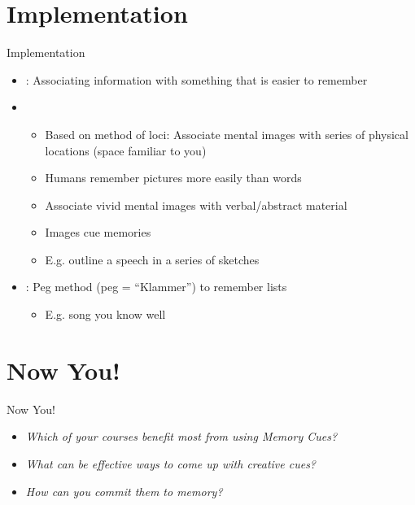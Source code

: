\documentclass{ercisbeamer}
\begin{document}
\section{Implementation}
\begin{frame}{Implementation}
    \begin{tbox}
        \begin{itemize}
            \item {}: Associating information with something that is easier to remember
            \item {}
            \begin{itemize}
                \item Based on method of loci: Associate mental images with series of physical locations (space familiar to you)
                \item Humans remember pictures more easily than words
                \item Associate vivid mental images with verbal/abstract material
                \item Images cue memories
                \item E.g. outline a speech in a series of sketches
            \end{itemize}
            \item {}: Peg method (peg = ``Klammer'') to remember lists
            \begin{itemize}
                \item E.g. song you know well
            \end{itemize}
        \end{itemize}
    \end{tbox}
\end{frame}
\setbgimage{}

\section{Now You!}
\begin{frame}{Now You!}
    \begin{itemize}
        \item \emph{Which of your courses benefit most from using Memory Cues? }
        \item \emph{What can be effective ways to come up with creative cues?}
        \item \emph{How can you commit them to memory?}
    \end{itemize}
\end{frame}
\end{document}
